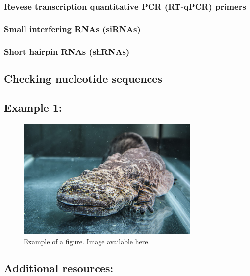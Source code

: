 \documentclass[letterpaper, 12pt]{article}
\begin{document}
\subsubsection*{Revese transcription quantitative PCR (RT-qPCR) primers}

\subsubsection*{Small interfering RNAs (siRNAs)}

\subsubsection*{Short hairpin RNAs (shRNAs)}

\subsection*{Checking nucleotide sequences}

\subsection*{Example 1:}

\begin{figure}[h!tbp]
    \centering
    \includegraphics[width=0.8\textwidth]{img/home/chinese_giant_salamander.jpg}
    \caption*{Example of a figure. Image available \href{https://commons.wikimedia.org/wiki/File:Velemlok_\%C4\%8D\%C3\%ADnsk\%C3\%BD_zoo_praha_1.jpg}{here}.}
\end{figure}

\subsection*{Additional resources:}
\end{document}

